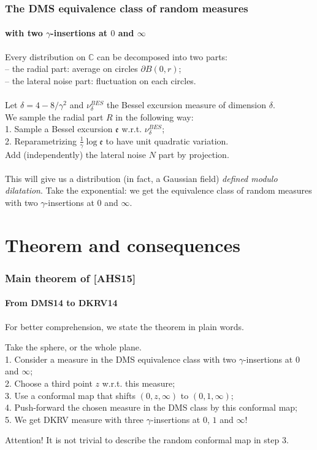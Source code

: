 \documentclass[aspectratio=169]{beamer}
\begin{document}
\begin{frame}
\frametitle{The DMS equivalence class of random measures}
\framesubtitle{with two $\gamma$-insertions at $0$ and $\infty$}
\begin{definition}
Every distribution on $\mathbb{C}$ can be decomposed into two parts:\\
-- the radial part: average on circles $\partial B(0,r)$;\\
-- the lateral noise part: fluctuation on each circles.\\
~\\
Let $\delta=4-8/\gamma^2$ and $\nu^{BES}_\delta$ the Bessel excursion measure of dimension $\delta$.\\
We sample the radial part $R$ in the following way:\\
1. Sample a Bessel excursion $\mathfrak{e}$ w.r.t. $\nu^{BES}_\delta$;\\
2. Reparametrizing $\frac{1}{\gamma}\log\mathfrak{e}$ to have unit quadratic variation.\\
Add (independently) the lateral noise $N$ part by projection.\\
~\\
This will give us a distribution (in fact, a Gaussian field) \emph{defined modulo dilatation}. Take the exponential: we get the equivalence class of random measures with two $\gamma$-insertions at $0$ and $\infty$.
\end{definition}
\end{frame}


\section{Theorem and consequences}

\begin{frame}
\frametitle{Main theorem of [AHS15]}
\framesubtitle{From DMS14 to DKRV14}
For better comprehension, we state the theorem in plain words.
\begin{theorem}[AHS15]
Take the sphere, or the whole plane.\\
1. Consider a measure in the DMS equivalence class with two $\gamma$-insertions at $0$ and $\infty$;\\
2. Choose a third point $z$ w.r.t. this measure;\\
3. Use a conformal map that shifts $(0,z,\infty)$ to $(0,1,\infty)$;\\
4. Push-forward the chosen measure in the DMS class by this conformal map;\\
5. We get DKRV measure with three $\gamma$-insertions at $0$, $1$ and $\infty$!
\end{theorem}
Attention! It is not trivial to describe the random conformal map in step 3.
\end{frame}
\end{document}
